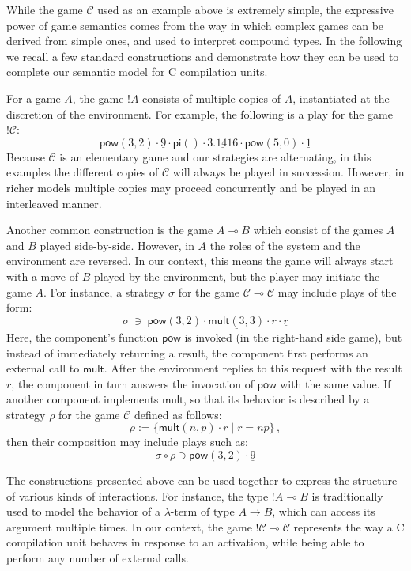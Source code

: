 \documentclass[acmsmall,timestamp,review,anonymous]{acmart}
\newcommand{\kw}[1]{\ensuremath{ \mathsf{#1} }}
\begin{document}
While the game $\mathcal{C}$ used as an example above
is extremely simple,
the expressive power of game semantics
comes from the way in which complex games can be derived from simple ones,
and used to interpret compound types.
In the following we recall a few standard constructions
and demonstrate how they can be used
to complete our semantic model for C compilation units.

For a game $A$,
the game $!A$ consists of multiple copies of $A$,
instantiated at the discretion of the environment.
For example,
the following is a play for the game $!\mathcal{C}$:
\[
    \kw{pow}(3,2) \cdot
    \underline{9} \cdot
    \kw{pi}() \cdot
    \underline{3.1416} \cdot
    \kw{pow}(5,0) \cdot
    \underline{1}
\]
Because $\mathcal{C}$ is an elementary game
and our strategies are alternating,
in this examples the different copies of $\mathcal{C}$
will always be played in succession.
However,
in richer models multiple copies may proceed
concurrently
and be played in an interleaved manner.

Another common construction is the game $A \multimap B$
which consist of the games $A$ and $B$ played side-by-side.
However, in $A$ the roles of the system and the environment
are reversed.
In our context,
this means the game will always start
with a move of $B$ played by the environment,
but the player may initiate the game $A$.
For instance, a strategy $\sigma$
for the game $\mathcal{C} \multimap \mathcal{C}$
may include plays of the form:
\[
    \sigma \: \ni \:
    \kw{pow}(3,2) \cdot
    \underline{\kw{mult}(3,3)} \cdot
    r \cdot
    \underline{r}
\]
Here,
the component's function $\kw{pow}$
is invoked (in the right-hand side game),
but instead of immediately returning a result,
the component first performs an external call to $\kw{mult}$.
After the environment replies to this request with the result $r$,
the component in turn answers the invocation of $\kw{pow}$
with the same value.
If another component implements $\kw{mult}$,
so that its behavior is described by a strategy $\rho$
for the game $\mathcal{C}$ defined as follows:
\[ \rho := \{ \kw{mult}(n,p) \cdot \underline{r} \mid r = n p \} \,, \]
then their composition may include plays such as:
\[ \sigma \circ \rho \ni \kw{pow}(3,2) \cdot \underline{9} \]

The constructions presented above can be used together
to express the structure of various kinds of interactions.
For instance,
the type $!A \multimap B$ is traditionally used
to model the behavior of a $\lambda$-term of type $A \rightarrow B$,
which can access its argument multiple times.
In our context,
the game $!\mathcal{C} \multimap \mathcal{C}$
represents the way a C compilation unit behaves in response to
an activation,
while being able to perform any number of external calls.
\end{document}
